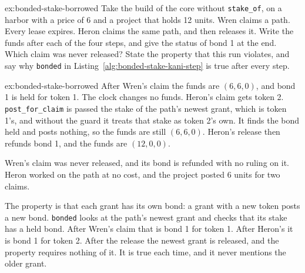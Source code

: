 \documentclass[11pt,a4paper]{article}
\theoremstyle{definition}
\theoremstyle{remark}
\begin{document}
\begin{pdexercise}[kind=Trace,rating=2]{ex:bonded-stake-borrowed}
Take the build of the core without \texttt{stake\_of}, on a harbor with a price of 6 and a project that holds 12 units. Wren claims a path. Every lease expires. Heron claims the same path, and then releases it. Write the funds after each of the four steps, and give the status of bond 1 at the end. Which claim was never released? State the property that this run violates, and say why \texttt{bonded} in Listing~\ref{alg:bonded-stake-kani-step} is true after every step.
\end{pdexercise}
\begin{pdsolution}{ex:bonded-stake-borrowed}
After Wren's claim the funds are $(6,6,0)$, and bond 1 is held for token 1. The clock changes no funds. Heron's claim gets token 2. \texttt{post\_for\_claim} is passed the stake of the path's newest grant, which is token 1's, and without the guard it treats that stake as token 2's own. It finds the bond held and posts nothing, so the funds are still $(6,6,0)$. Heron's release then refunds bond 1, and the funds are $(12,0,0)$.

Wren's claim was never released, and its bond is refunded with no ruling on it. Heron worked on the path at no cost, and the project posted 6 units for two claims.

The property is that each grant has its own bond: a grant with a new token posts a new bond. \texttt{bonded} looks at the path's newest grant and checks that its stake has a held bond. After Wren's claim that is bond 1 for token 1. After Heron's it is bond 1 for token 2. After the release the newest grant is released, and the property requires nothing of it. It is true each time, and it never mentions the older grant.
\end{pdsolution}
\end{document}
